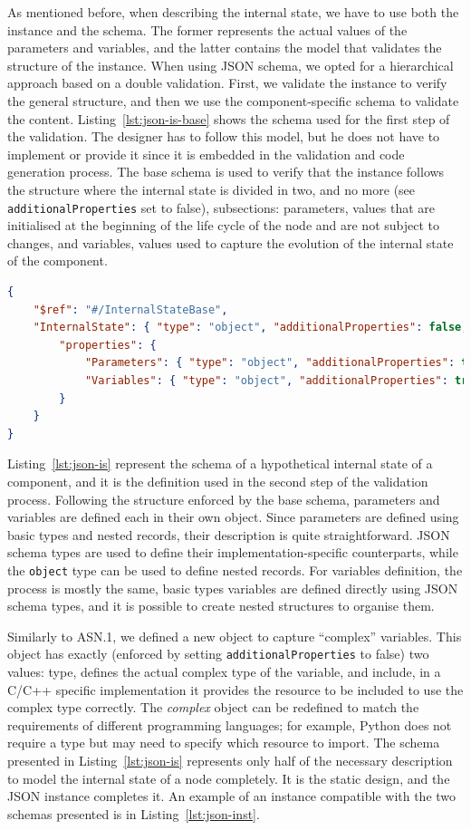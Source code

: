 As mentioned before, when describing the internal state, we have to use both the instance and the schema. The former represents the actual values of the parameters and variables, and the latter contains the model that validates the structure of the instance. When using JSON schema, we opted for a hierarchical approach based on a double validation. First, we validate the instance to verify the general structure, and then we use the component-specific schema to validate the content. Listing~\ref{lst:json-is-base} shows the schema used for the first step of the validation. The designer has to follow this model, but he does not have to implement or provide it since it is embedded in the validation and code generation process. The base schema is used to verify that the instance follows the structure where the internal state is divided in two, and no more (see \texttt{additionalProperties} set to false), subsections: parameters, values that are initialised at the beginning of the life cycle of the node and are not subject to changes, and variables, values used to capture the evolution of the internal state of the component.

\begin{lstlisting}[language=JSON, caption={Base schema of the internal state defined using JSON schema},label=lst:json-is-base]
{
	"$ref": "#/InternalStateBase",
	"InternalState": { "type": "object", "additionalProperties": false,
		"properties": {
			"Parameters": { "type": "object", "additionalProperties": true },
			"Variables": { "type": "object", "additionalProperties": true }
		}
	}
}
\end{lstlisting}

Listing~\ref{lst:json-is} represent the schema of a hypothetical internal state of a component, and it is the definition used in the second step of the validation process. Following the structure enforced by the base schema, parameters and variables are defined each in their own object. Since parameters are defined using basic types and nested records, their description is quite straightforward. JSON schema types are used to define their implementation-specific counterparts, while the \texttt{object} type can be used to define nested records. For variables definition, the process is mostly the same, basic types variables are defined directly using JSON schema types, and it is possible to create nested structures to organise them.

Similarly to ASN.1, we defined a new object to capture ``complex'' variables. This object has exactly (enforced by setting \texttt{additionalProperties} to false) two values: type, defines the actual complex type of the variable, and include, in a C/C++ specific implementation it provides the resource to be included to use the complex type correctly. The \textit{complex} object can be redefined to match the requirements of different programming languages; for example, Python does not require a type but may need to specify which resource to import. The schema presented in Listing~\ref{lst:json-is} represents only half of the necessary description to model the internal state of a node completely. It is the static design, and the JSON instance completes it. An example of an instance compatible with the two schemas presented is in Listing~\ref{lst:json-inst}.

